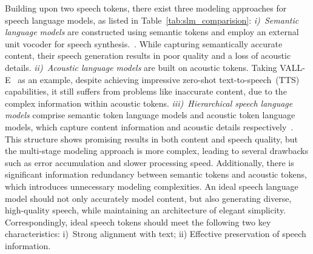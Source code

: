 Building upon two speech tokens, there exist three modeling approaches for speech language models, as listed in Table~\ref{tab:slm_comparision}:
\textit{i)~Semantic language models} are constructed using semantic tokens and employ an external unit vocoder for speech synthesis.~\citep{lakhotia2021generative, zhang2023speechgpt, hassid2023textually}. While capturing semantically accurate content, their speech generation results in poor quality and a loss of acoustic details.
\textit{ii)~Acoustic language models} are built on acoustic tokens. Taking VALL-E~\citep{wang2023neural} as an example, despite achieving impressive zero-shot text-to-speech~(TTS) capabilities, it still suffers from problems like inaccurate content, due to the complex information within acoustic tokens.
\textit{iii)~Hierarchical speech language models} comprise semantic token language models and acoustic token language models, which capture content information and acoustic details respectively~\citep{borsos2022audiolm, rubenstein2023audiopalm, dong2023polyvoice}. This structure shows promising results in both content and speech quality, but the multi-stage modeling approach is more complex, leading to several drawbacks such as error accumulation and slower processing speed. Additionally, there is significant information redundancy between semantic tokens and acoustic tokens, which introduces unnecessary modeling complexities. 
An ideal speech language model should not only accurately model content, but also generating diverse, high-quality speech, while maintaining an architecture of elegant simplicity.
Correspondingly, ideal speech tokens should meet the following two key characteristics: i)~Strong alignment with text; ii) Effective preservation of speech information.



